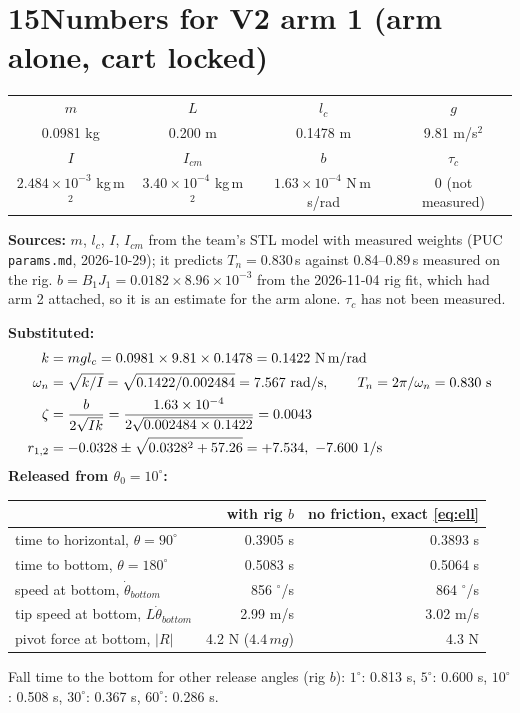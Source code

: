 \documentclass[11pt]{article}
\begin{document}
\section*{15\quad Numbers for V2 arm 1 (arm alone, cart locked)}
\begin{center}\renewcommand{\arraystretch}{1.1}
\begin{tabular}{cccc}
\toprule
$m$ & $L$ & $l_c$ & $g$\\
0.0981 kg & 0.200 m & 0.1478 m & 9.81 m/s$^2$\\
\midrule
$I$ & $I_{cm}$ & $b$ & $\tau_c$\\
$2.484\times10^{-3}$ kg\,m$^2$ & $3.40\times10^{-4}$ kg\,m$^2$ & $1.63\times10^{-4}$ N\,m\,s/rad & 0 (not measured)\\
\bottomrule
\end{tabular}\end{center}
\textbf{Sources: }$m$, $l_c$, $I$, $I_{cm}$ from the team's STL model with measured weights (PUC \texttt{params.md}, 2026-10-29); it predicts $T_n=0.830$\,s against 0.84--0.89\,s measured on the rig. $b=B_1J_1=0.0182\times8.96\times10^{-3}$ from the 2026-11-04 rig fit, which had arm 2 attached, so it is an estimate for the arm alone. $\tau_c$ has not been measured.

\textbf{Substituted:}
\begin{align*}
k&=m g l_c=0.0981\times9.81\times0.1478=0.1422\ \text{N\,m/rad}\\
\omega_n&=\sqrt{k/I}=\sqrt{0.1422/0.002484}=7.567\ \text{rad/s},\qquad T_n=2\pi/\omega_n=0.830\ \text{s}\\
\zeta&=\frac{b}{2\sqrt{Ik}}=\frac{1.63\times10^{-4}}{2\sqrt{0.002484\times0.1422}}=0.0043\\
r_{1,2}&=-0.0328\pm\sqrt{0.0328^2+57.26}=+7.534,\ -7.600\ \text{1/s}
\end{align*}
\textbf{Released from $\theta_0=10^\circ$:}
\begin{center}
\renewcommand{\arraystretch}{1.15}
\begin{tabular}{lrr}
\toprule
 & with rig $b$ & no friction, exact \eqref{eq:ell}\\
\midrule
time to horizontal, $\theta=90^\circ$ & 0.3905 s & 0.3893 s\\
time to bottom, $\theta=180^\circ$ & 0.5083 s & 0.5064 s\\
speed at bottom, $\dot\theta_{bottom}$ & 856 $^\circ$/s & 864 $^\circ$/s\\
tip speed at bottom, $L\dot\theta_{bottom}$ & 2.99 m/s & 3.02 m/s\\
pivot force at bottom, $|R|$ & 4.2 N ($4.4\,mg$) & 4.3 N\\
\bottomrule
\end{tabular}
\end{center}
Fall time to the bottom for other release angles (rig $b$): $1^\circ$: 0.813 s, $5^\circ$: 0.600 s, $10^\circ$: 0.508 s, $30^\circ$: 0.367 s, $60^\circ$: 0.286 s.
\end{document}
